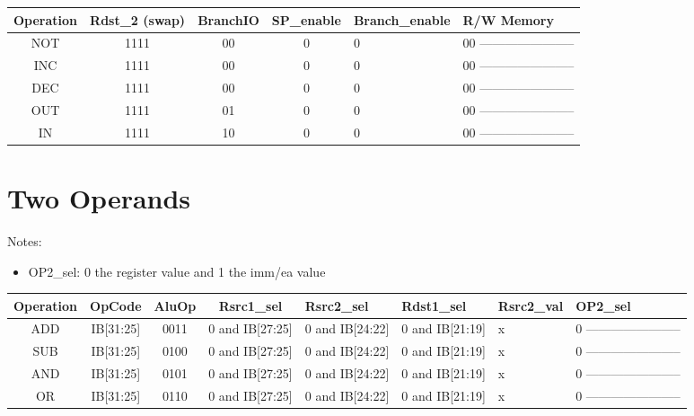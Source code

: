 \documentclass[12pt]{report}
\begin{document}
    \begin{center}
    \begin{tabular}{||c| c| c| c| p{40mm}||} 
    \hline
    Operation & Rdst_2 (swap) & BranchIO & SP_enable & Branch_enable & R/W Memory  \\ [0.5ex] 
    \hline\hline
    NOT & 1111 & 00 & 0 & 0 & 00 ----------------------- \\
    \hline
    INC & 1111 & 00 & 0 & 0 & 00 ----------------------- \\
    \hline
    DEC & 1111 & 00 & 0 & 0 & 00 ----------------------- \\
    \hline
    OUT & 1111 & 01 & 0 & 0 & 00 ----------------------- \\
    \hline
    IN  & 1111 & 10 & 0 & 0 & 00 ----------------------- \\
    \hline

    \end{tabular}
    \end{center}


    \section{Two Operands}
    \item Notes:
    \begin{itemize}
        \item OP2_sel: 0 the register value and 1 the imm/ea value
    \end{itemize}

    \begin{center}
    \begin{tabular}{||c| c| c| c| p{40mm}||} 
    \hline
    Operation & OpCode & AluOp & Rsrc1_sel & Rsrc2_sel & Rdst1_sel & Rsrc2_val & OP2_sel  \\ [0.5ex] 
    \hline\hline
    ADD & IB[31:25] & 0011 & 0 and IB[27:25] & 0 and IB[24:22] & 0 and IB[21:19] & x & 0 ----------------------- \\
    \hline
    SUB & IB[31:25] & 0100 & 0 and IB[27:25] & 0 and IB[24:22] & 0 and IB[21:19] & x & 0 ----------------------- \\
    \hline
    AND & IB[31:25] & 0101 & 0 and IB[27:25] & 0 and IB[24:22] & 0 and IB[21:19] & x & 0 ----------------------- \\
    \hline
    OR  & IB[31:25] & 0110 & 0 and IB[27:25] & 0 and IB[24:22] & 0 and IB[21:19] & x & 0 ----------------------- \\
    \hline

    \end{tabular}
    \end{center}
\end{document}
